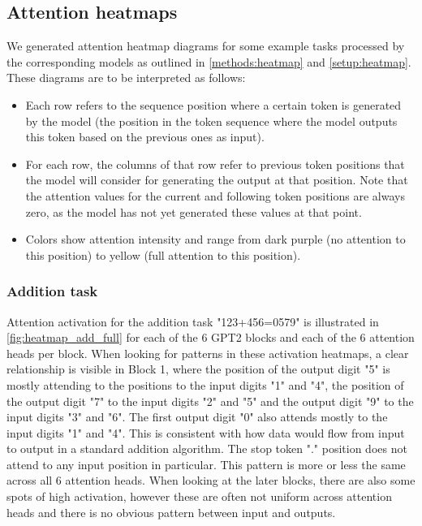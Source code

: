 \FloatBarrier
\subsection{Attention heatmaps}
\label{results:heatmap}

We generated attention heatmap diagrams for some example tasks processed by the corresponding models as outlined in \cref{methods:heatmap} and \cref{setup:heatmap}.
These diagrams are to be interpreted as follows:

\begin{itemize}
	\item Each row refers to the sequence position where a certain token is generated by the model (the position in the token sequence where the model outputs this token based on the previous ones as input).
	
	\item For each row, the columns of that row refer to previous token positions that the model will consider for generating the output at that position. Note that the attention values for the current and following token positions are always zero, as the model has not yet generated these values at that point.
	
	\item Colors show attention intensity and range from dark purple (no attention to this position) to yellow (full attention to this position).
\end{itemize}


\subsubsection{Addition task}

Attention activation for the addition task "123+456=0579" is illustrated in \cref{fig:heatmap_add_full} for each of the 6 GPT2 blocks and each of the 6 attention heads per block.
When looking for patterns in these activation heatmaps, a clear relationship is visible in Block 1, where the position of the output digit "5" is mostly attending to the positions to the input digits "1" and "4", the position of the output digit "7" to the input digits "2" and "5" and the output digit "9" to the input digits "3" and "6". The first output digit "0" also attends mostly to the input digits "1" and "4". This is consistent with how data would flow from input to output in a standard addition algorithm. The stop token "." position does not attend to any input position in particular.
This pattern is more or less the same across all 6 attention heads.
When looking at the later blocks, there are also some spots of high activation, however these are often not uniform across attention heads and there is no obvious pattern between input and outputs.

